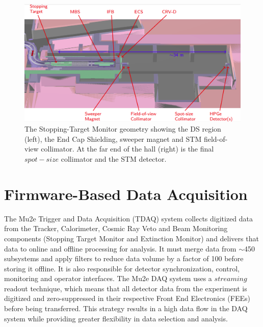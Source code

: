 \begin{figure}[!h]
\centering
\includegraphics[width =\textwidth]{images/chapter2/Screenshot_20240306_180910.png}
\caption{The Stopping-Target Monitor geometry showing the DS region (left), the End Cap Shielding, sweeper magnet and STM field-of-view collimator. At the far end of the hall (right) is the final $spot-size$ collimator and the STM detector.}
\label{fig:stm}
\end{figure}
\section{Firmware-Based Data Acquisition}
The Mu2e Trigger and Data Acquisition (TDAQ) system collects digitized data from the Tracker, Calorimeter, Cosmic Ray Veto and Beam Monitoring components (Stopping Target Monitor and Extinction Monitor) and delivers that data to online and offline processing for analysis. It must merge data from $\sim$450 subsystems and apply filters to reduce data volume by a factor of 100 before storing it offline. It is also responsible for detector synchronization, control, monitoring and operator interfaces. The Mu2e DAQ system uses a $streaming$ readout technique, which means that all detector data from the experiment is digitized and zero-suppressed in their respective Front End Electronics (FEEs) before being transferred. This strategy results in a high data flow in the DAQ system while providing greater flexibility in data selection and analysis.
